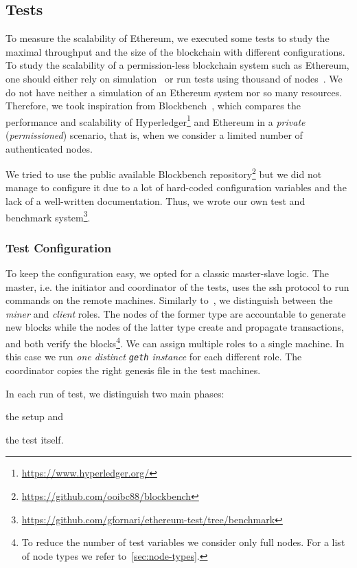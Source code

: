 \subsection{Tests}
\label{sec:tests}

To measure the scalability of Ethereum, we executed some tests to study the
maximal throughput and the size of the blockchain with different configurations.
To study the scalability of a permission-less blockchain system such as
Ethereum, one should either rely on
simulation~\cite{bib:securityAndScalabilityPoW} or run tests using thousand of
nodes~\cite{bib:securityAndScalabilityPoW, bib:algorand}. We do not have neither
a simulation of an Ethereum system nor so many resources. Therefore, we took
inspiration from Blockbench~\cite{blockbench}, which compares the performance
and scalability of Hyperledger\footnote{\url{https://www.hyperledger.org/}} and
Ethereum in a \emph{private} (\emph{permissioned}) scenario, that is, when we
consider a limited number of authenticated nodes.

We tried to use the public available Blockbench
repository\footnote{\url{https://github.com/ooibc88/blockbench}} but we did not
manage to configure it due to a lot of hard-coded configuration variables and
the lack of a well-written documentation. Thus, we wrote our own test and
benchmark
system\footnote{\url{https://github.com/gfornari/ethereum-test/tree/benchmark}}.


\subsubsection{Test Configuration}

To keep the configuration easy, we opted for a classic master-slave logic. The
master, i.e. the initiator and coordinator of the tests, uses the ssh protocol
to run commands on the remote machines. Similarly to~\cite{blockbench}, we
distinguish between the \emph{miner} and \emph{client} roles. The nodes of the
former type are accountable to generate new blocks while the nodes of the latter
type create and propagate transactions, and both verify the blocks\footnote{To
reduce the number of test variables we consider only full nodes. For a list of
node types we refer to~\autoref{sec:node-types}.}. We can assign multiple roles
to a single machine. In this case we run \emph{one distinct \texttt{geth}
instance} for each different role. The coordinator copies the right genesis file
in the test machines.

In each run of test, we distinguish two main phases:
\begin{enumerate*}
  \item the setup and
  \item the test itself.
\end{enumerate*}


